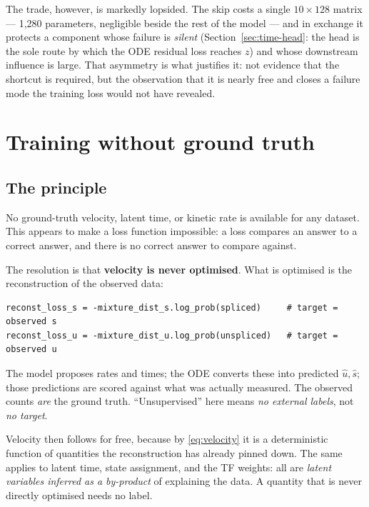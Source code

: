 \documentclass[11pt,a4paper]{article}
\newcommand{\uns}{u}
\newcommand{\spl}{s}
\theoremstyle{definition}
\begin{document}
The trade, however, is markedly lopsided. The skip costs a single
$10 \times 128$ matrix --- 1{,}280 parameters, negligible beside the rest of the
model --- and in exchange it protects a component whose failure is
\emph{silent} (Section~\ref{sec:time-head}: the head is the sole route by which
the ODE residual loss reaches $z$) and whose downstream influence is large.
That asymmetry is what justifies it: not evidence that the shortcut is
required, but the observation that it is nearly free and closes a failure mode
the training loss would not have revealed.

\section{Training without ground truth}
\label{sec:training}

\subsection{The principle}

No ground-truth velocity, latent time, or kinetic rate is available for any
dataset. This appears to make a loss function impossible: a loss compares an
answer to a correct answer, and there is no correct answer to compare against.

The resolution is that \textbf{velocity is never optimised}. What is optimised
is the reconstruction of the observed data:

\begin{lstlisting}
reconst_loss_s = -mixture_dist_s.log_prob(spliced)     # target = observed s
reconst_loss_u = -mixture_dist_u.log_prob(unspliced)   # target = observed u
\end{lstlisting}

The model proposes rates and times; the ODE converts these into predicted
$\hat{\uns}, \hat{\spl}$; those predictions are scored against what was actually
measured. The observed counts \emph{are} the ground truth. ``Unsupervised''
here means \emph{no external labels}, not \emph{no target}.

Velocity then follows for free, because by \eqref{eq:velocity} it is a
deterministic function of quantities the reconstruction has already pinned
down. The same applies to latent time, state assignment, and the TF weights:
all are \emph{latent variables inferred as a by-product} of explaining the
data. A quantity that is never directly optimised needs no label.
\end{document}
